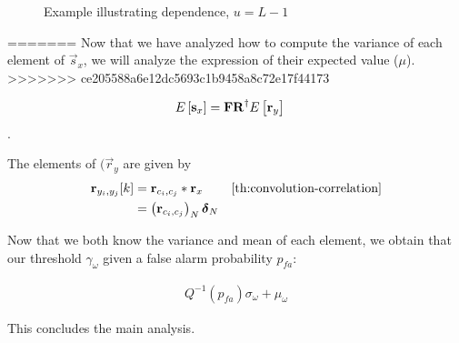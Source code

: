 \documentclass[a4paper, openany, oneside]{memoir}
\begin{document}
\begin{figure}
\caption{Example illustrating dependence, $u=L-1$}
\label{fig:ex_dep}
\end{figure}
=======
Now that we have analyzed how to compute the variance of each element of $\vec{s}_x$, we will analyze the expression of their expected value ($\mu$).
>>>>>>> ce205588a6e12dc5693c1b9458a8c72e17f44173

\begin{align*}
E\left[\boldsymbol{\mathbf{s}}_x\right] &= \boldsymbol{\mathbf{F}}\boldsymbol{\mathbf{R}}^{\dagger}E\left[\boldsymbol{\mathbf{r}}_y\right] 
\end{align*}.

The elements of $(\vec{r}_y$ are given by 
\begin{align*}
\vec{r}_{y_i, y_j}[k] &= \vec{r}_{c_i,c_j} \ast \vec{r}_x & \text{\cref{th:convolution-correlation}} \\
&=  \left( \vec{r}_{c_i,c_j}\right)_N  \vec{\delta}_N
\end{align*}

Now that we both know the variance and mean of each element, we obtain that our threshold $\gamma_{\omega}$ given a false alarm probability $p_{fa}$:

\begin{align*}
Q^{-1}(p_{fa})\sigma_{\omega} + \mu_{\omega}
\end{align*}

This concludes the main analysis.
\end{document}
